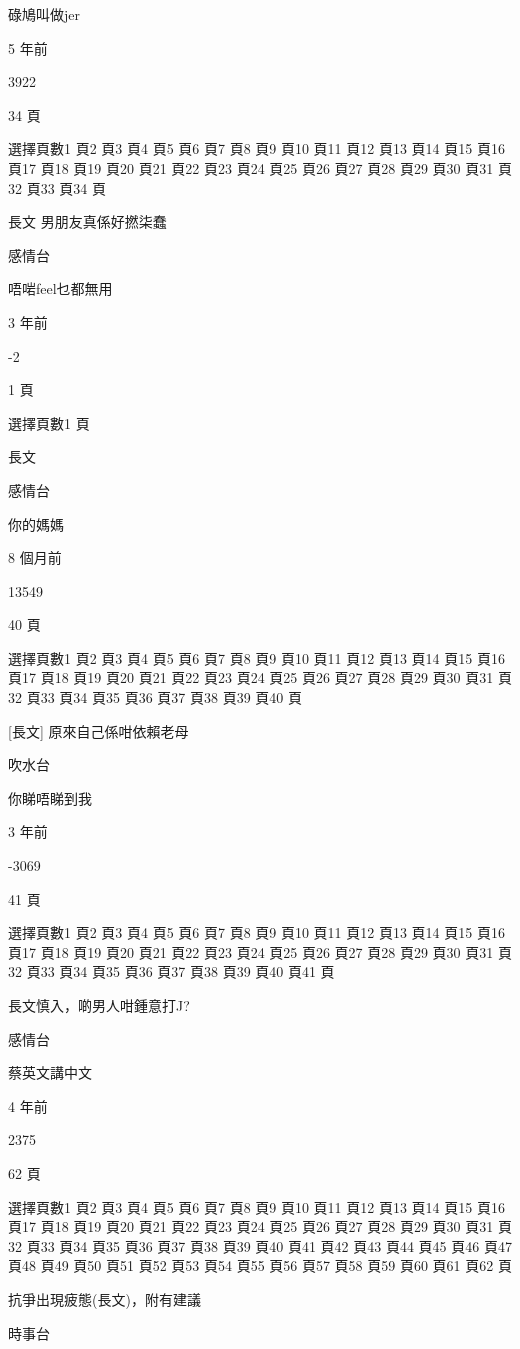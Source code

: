 碌鳩叫做jer

5 年前

3922

34 頁

選擇頁數1 頁2 頁3 頁4 頁5 頁6 頁7 頁8 頁9 頁10 頁11 頁12 頁13 頁14 頁15 頁16 頁17 頁18 頁19 頁20 頁21 頁22 頁23 頁24 頁25 頁26 頁27 頁28 頁29 頁30 頁31 頁32 頁33 頁34 頁

長文 男朋友真係好撚柒蠢

感情台

唔啱feel乜都無用

3 年前

-2

1 頁

選擇頁數1 頁

長文

感情台

你的媽媽

8 個月前

13549

40 頁

選擇頁數1 頁2 頁3 頁4 頁5 頁6 頁7 頁8 頁9 頁10 頁11 頁12 頁13 頁14 頁15 頁16 頁17 頁18 頁19 頁20 頁21 頁22 頁23 頁24 頁25 頁26 頁27 頁28 頁29 頁30 頁31 頁32 頁33 頁34 頁35 頁36 頁37 頁38 頁39 頁40 頁

[長文] 原來自己係咁依賴老母

吹水台

你睇唔睇到我

3 年前

-3069

41 頁

選擇頁數1 頁2 頁3 頁4 頁5 頁6 頁7 頁8 頁9 頁10 頁11 頁12 頁13 頁14 頁15 頁16 頁17 頁18 頁19 頁20 頁21 頁22 頁23 頁24 頁25 頁26 頁27 頁28 頁29 頁30 頁31 頁32 頁33 頁34 頁35 頁36 頁37 頁38 頁39 頁40 頁41 頁

長文慎入，啲男人咁鍾意打J?

感情台

蔡英文講中文

4 年前

2375

62 頁

選擇頁數1 頁2 頁3 頁4 頁5 頁6 頁7 頁8 頁9 頁10 頁11 頁12 頁13 頁14 頁15 頁16 頁17 頁18 頁19 頁20 頁21 頁22 頁23 頁24 頁25 頁26 頁27 頁28 頁29 頁30 頁31 頁32 頁33 頁34 頁35 頁36 頁37 頁38 頁39 頁40 頁41 頁42 頁43 頁44 頁45 頁46 頁47 頁48 頁49 頁50 頁51 頁52 頁53 頁54 頁55 頁56 頁57 頁58 頁59 頁60 頁61 頁62 頁

抗爭出現疲態(長文)，附有建議

時事台

